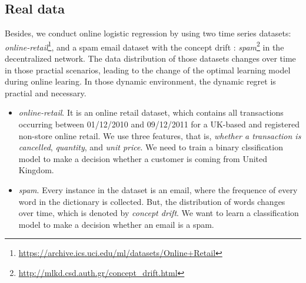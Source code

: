 \documentclass{article}
\begin{document}
\subsection{Real data}
Besides, we conduct online logistic regression by using two time series datasets:  \textit{online-retail}\footnote{\url{https://archive.ics.uci.edu/ml/datasets/Online+Retail}},  and a spam email dataset with the concept drift \citep{Katakis:2010:TR}: \textit{spam}\footnote{\url{http://mlkd.csd.auth.gr/concept_drift.html}} in the decentralized network. The data distribution of those datasets changes over time in those practial scenarios, leading to the change of the optimal learning model during online learing. In those dynamic environment, the dynamic regret is practial and necessary. 
\begin{itemize}
\item {\textit{online-retail}.} It is an online retail dataset, which contains all transactions occurring between 01/12/2010 and 09/12/2011 for a UK-based and registered non-store online retail. We use three features, that is, \textit{whether a transaction is cancelled}, \textit{quantity}, and \textit{unit price}. We need to train a binary clssification model to make a decision whether a customer is coming from United Kingdom. 
\item {\textit{spam}.} Every instance in the dataset is an email, where the frequence of every word in the dictionary is collected. But, the distribution of words changes over time, which is denoted by \textit{concept drift}\citep{Katakis:2010:TR}. We want to learn a classification model to make a decision whether an email is a spam. 
\end{itemize}
\end{document}
